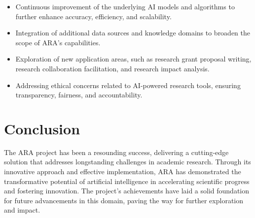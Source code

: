 \documentclass[a4paper]{article}
\begin{document}
\begin{itemize}
   \item Continuous improvement of the underlying AI models and algorithms to further enhance accuracy, efficiency, and scalability.
   \item Integration of additional data sources and knowledge domains to broaden the scope of ARA's capabilities.
   \item Exploration of new application areas, such as research grant proposal writing, research collaboration facilitation, and research impact analysis.
   \item Addressing ethical concerns related to AI-powered research tools, ensuring transparency, fairness, and accountability.
\end{itemize}

\section{Conclusion}
The ARA project has been a resounding success, delivering a cutting-edge solution that addresses longstanding challenges in academic research. Through its innovative approach and effective implementation, ARA has demonstrated the transformative potential of artificial intelligence in accelerating scientific progress and fostering innovation. The project's achievements have laid a solid foundation for future advancements in this domain, paving the way for further exploration and impact.
\end{document}
